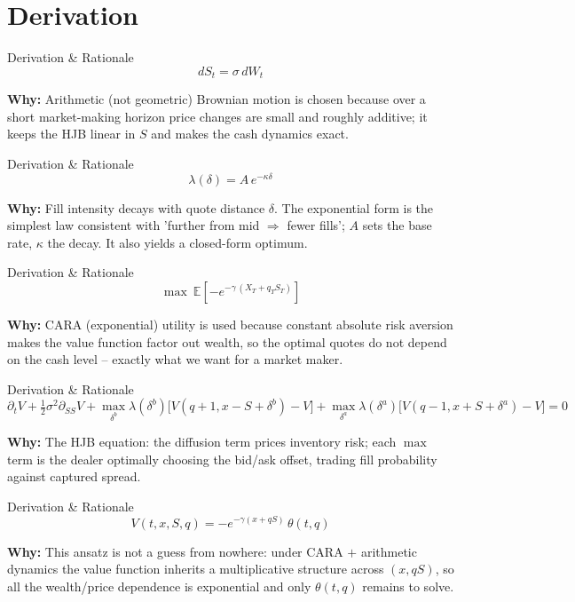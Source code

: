 \documentclass[aspectratio=169,10pt]{beamer}
\begin{document}
\section*{Derivation}
\begin{frame}{Derivation \& Rationale}
\[dS_t = \sigma\, dW_t\]

\small\textbf{\color{ncsured}Why:} Arithmetic (not geometric) Brownian motion is chosen because over a short market-making horizon price changes are small and roughly additive; it keeps the HJB linear in $S$ and makes the cash dynamics exact.
\end{frame}

\begin{frame}{Derivation \& Rationale}
\[\lambda(\delta) = A\, e^{-\kappa \delta}\]

\small\textbf{\color{ncsured}Why:} Fill intensity decays with quote distance $\delta$. The exponential form is the simplest law consistent with 'further from mid $\Rightarrow$ fewer fills'; $A$ sets the base rate, $\kappa$ the decay. It also yields a closed-form optimum.
\end{frame}

\begin{frame}{Derivation \& Rationale}
\[\max\ \mathbb{E}\!\left[-e^{-\gamma\,(X_T + q_T S_T)}\right]\]

\small\textbf{\color{ncsured}Why:} CARA (exponential) utility is used because constant absolute risk aversion makes the value function factor out wealth, so the optimal quotes do not depend on the cash level -- exactly what we want for a market maker.
\end{frame}

\begin{frame}{Derivation \& Rationale}
\[\partial_t V + \tfrac12\sigma^2 \partial_{SS} V + \max_{\delta^b}\lambda(\delta^b)\big[V(q{+}1,x{-}S{+}\delta^b)-V\big]+ \max_{\delta^a}\lambda(\delta^a)\big[V(q{-}1,x{+}S{+}\delta^a)-V\big]=0\]

\small\textbf{\color{ncsured}Why:} The HJB equation: the diffusion term prices inventory risk; each $\max$ term is the dealer optimally choosing the bid/ask offset, trading fill probability against captured spread.
\end{frame}

\begin{frame}{Derivation \& Rationale}
\[V(t,x,S,q) = -e^{-\gamma(x+qS)}\,\theta(t,q)\]

\small\textbf{\color{ncsured}Why:} This ansatz is not a guess from nowhere: under CARA $+$ arithmetic dynamics the value function inherits a multiplicative structure across $(x, qS)$, so all the wealth/price dependence is exponential and only $\theta(t,q)$ remains to solve.
\end{frame}
\end{document}
